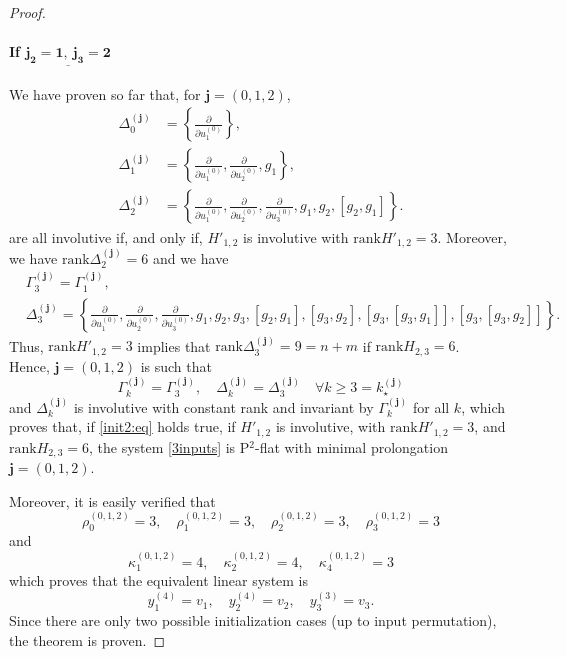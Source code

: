 \documentclass[10pt]{article}
\newcommand{\3}{\mathbf{3}}
\newcommand{\2}{\mathbf{2}}
\newcommand{\1}{\mathbf{1}}
\newcommand{\0}{\mathbf{0}}
\newcommand{\mbf}[1]{\mathbf{#1}}
\newcommand{\rk}{\mathrm{rank}}
\newcommand{\ddu}[2]{\frac{\partial}{\partial u_{#1}^{(#2)}}}
\begin{document}
\begin{proof}
\begin{enumerate}
%

\paragraph{If $\underline{\mathbf{j_{2}=1,~{j_{3}= 2}}}$}


%
We have proven so far that, for $\mbf{j}=(0,1,2)$,
$$\begin{aligned}
\Delta_{0}^{(\mbf{j})} &= \left\{\ddu{1}{0}\right\},\\
\Delta_{1}^{(\mbf{j})} &= \left\{\ddu{1}{0}, \ddu{2}{0},  g_{1} \right\},\\
\Delta_{2}^{(\mbf{j})} &= \left\{\ddu{1}{0}, \ddu{2}{0}, \ddu{3}{0}, g_{1}, g_{2}, [g_{2},g_{1}]\right\}.
\end{aligned}$$
are all involutive if, and only if, $H'_{1,2}$ is involutive with $\rk H'_{1,2} = 3$.  Moreover, we have $\rk \Delta_{2}^{(\mbf{j})} = 6$ and we have
$$\begin{aligned}&\Gamma_{3}^{(\mbf{j})} = \Gamma_{1}^{(\mbf{j})}, \\&\Delta_{3}^{(\mbf{j})} = \left\{\ddu{1}{0}, \ddu{2}{0}, \ddu{3}{0}, g_{1}, g_{2}, g_{3}, [g_{2},g_{1}], [g_{3},g_{2}], [g_{3},[g_{3},g_{1}]], [g_{3},[g_{3},g_{2}]] \right\}.\end{aligned}$$
Thus, $\rk H'_{1,2} = 3$ implies that  $\rk \Delta_{3}^{(\mbf{j})} = 9= n+m$ if $\rk H_{2,3} = 6$. \\
Hence,  $\mbf{j} = (0,1,2)$ is such that
$$\Gamma_{k}^{(\mbf{j})} = \Gamma_{3}^{(\mbf{j})} , \quad \Delta_{k}^{(\mbf{j})} =\Delta_{3}^{(\mbf{j})} \quad \forall k\geq 3 = k_{\star}^{(\mbf{j})}$$
and $\Delta_{k}^{(\mbf{j})}$ is involutive with constant rank  and invariant by $\Gamma_{k}^{(\mbf{j})}$ for all $k$,
which proves that, if \eqref{init2:eq}  holds true, if $H'_{1,2}$ is involutive, with $\rk H' _{1,2} = 3$, and $\rk H_{2,3} = 6$, the system \eqref{3inputs} is P$^{2}$-flat with minimal prolongation $\mbf{j}=(0,1,2)$.
\end{enumerate}

Moreover, it is easily verified that
$$\rho_{0}^{(0,1,2)}= 3, \quad \rho_{1}^{(0,1,2)}= 3, \quad \rho_{2}^{(0,1,2)}= 3, \quad \rho_{3}^{(0,1,2)}= 3$$
and
$$\kappa_{1}^{(0,1,2)}= 4, \quad \kappa_{2}^{(0,1,2)}= 4, \quad \kappa_{4}^{(0,1,2)}= 3$$
which proves that the equivalent linear system is
\begin{equation}\label{linequiv2:eq}
y_{1}^{(4)}= v_{1}, \quad y_{2}^{(4)}= v_{2}, \quad y_{3}^{(3)}= v_{3}.
\end{equation}
Since there are only two possible initialization cases (up to input permutation), the theorem is proven.
\end{proof}
\end{document}
